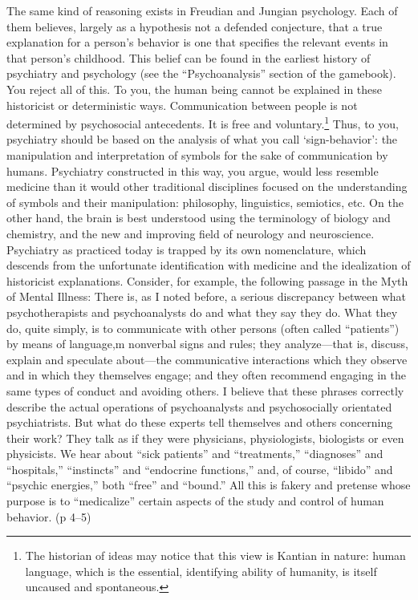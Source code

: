 The same kind of reasoning exists in Freudian and Jungian psychology. Each of them believes, largely as a hypothesis not a defended conjecture, that a true explanation for a person’s behavior is one that specifies the relevant events in that person’s childhood. This belief can be found in the earliest history of psychiatry and psychology (see the “Psychoanalysis” section of the gamebook).
You reject all of this. To you, the human being cannot be explained in these historicist or deterministic ways. Communication between people is not determined by psychosocial antecedents. It is free and voluntary.\footnote{The historian of ideas may notice that this view is Kantian in nature: human language, which is the essential, identifying ability of humanity, is itself uncaused and spontaneous.}
Thus, to you, psychiatry should be based on the analysis of what you call ‘sign-behavior’: the manipulation and interpretation of symbols for the sake of communication by humans. Psychiatry constructed in this way, you argue, would less resemble medicine than it would other traditional disciplines focused on the understanding of symbols and their manipulation: philosophy, linguistics, semiotics, etc. On the other hand, the brain is best understood using the terminology of biology and chemistry, and the new and improving field of neurology and neuroscience. Psychiatry as practiced today is trapped by its own nomenclature, which descends from the unfortunate identification with medicine and the idealization of historicist explanations.
Consider, for example, the following passage in the Myth of Mental Illness:
There is, as I noted before, a serious discrepancy between what psychotherapists and psychoanalysts do and what they say they do. What they do, quite simply, is to communicate with other persons (often called “patients”) by means of language,m nonverbal signs and rules; they analyze—that is, discuss, explain and speculate about—the communicative interactions which they observe and in which they themselves engage; and they often recommend engaging in the same types of conduct and avoiding others. I believe that these phrases correctly describe the actual operations of psychoanalysts and psychosocially orientated psychiatrists. But what do these experts tell themselves and others concerning their work? They talk as if they were physicians, physiologists, biologists or even physicists. We hear about “sick patients” and “treatments,” “diagnoses” and “hospitals,” “instincts” and “endocrine functions,” and, of course, “libido” and “psychic energies,” both “free” and “bound.” All this is fakery and pretense whose purpose is to “medicalize” certain aspects of the study and control of human behavior. (p 4--5)
